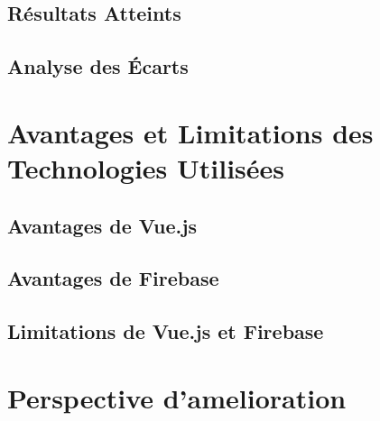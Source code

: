 \documentclass[a4paper,12pt]{report}
\begin{document}
    \subsection{Résultats Atteints}
    \subsection{Analyse des Écarts}
  \section{Avantages et Limitations des Technologies Utilisées}
    \subsection{Avantages de Vue.js}
    \subsection{Avantages de Firebase}
    \subsection{Limitations de Vue.js et Firebase}
  \section{Perspective d'amelioration}
  
\end{document}

